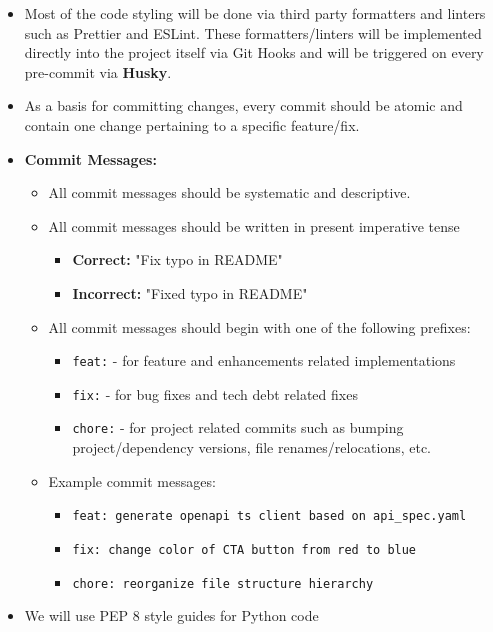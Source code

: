 \documentclass{article}
\begin{document}
\begin{itemize}
    \item Most of the code styling will be done via third party formatters and linters such as Prettier and ESLint. These formatters/linters will be implemented directly into the project itself via Git Hooks and will be triggered on every pre-commit via \textbf{Husky}.
    \item As a basis for committing changes, every commit should be atomic and contain one change pertaining to a specific feature/fix.
    \item \textbf{Commit Messages:}
    \begin{itemize}
        \item All commit messages should be systematic and descriptive.
        \item All commit messages should be written in present imperative tense
        \begin{itemize}
            \item \textbf{Correct:} "Fix typo in README"
            \item \textbf{Incorrect:} "Fixed typo in README"
        \end{itemize}
        \item All commit messages should begin with one of the following prefixes:
        \begin{itemize}
            \item \texttt{feat:} - for feature and enhancements related implementations
            \item \texttt{fix:} - for bug fixes and tech debt related fixes
            \item \texttt{chore:} - for project related commits such as bumping project/dependency versions, file renames/relocations, etc.
        \end{itemize}
        \item Example commit messages:
        \begin{itemize}
            \item \texttt{feat: generate openapi ts client based on api\_spec.yaml}
            \item \texttt{fix: change color of CTA button from red to blue}
            \item \texttt{chore: reorganize file structure hierarchy}
        \end{itemize}
    \end{itemize}
    \item We will use PEP 8 style guides for Python code
\end{itemize}
\end{document}
